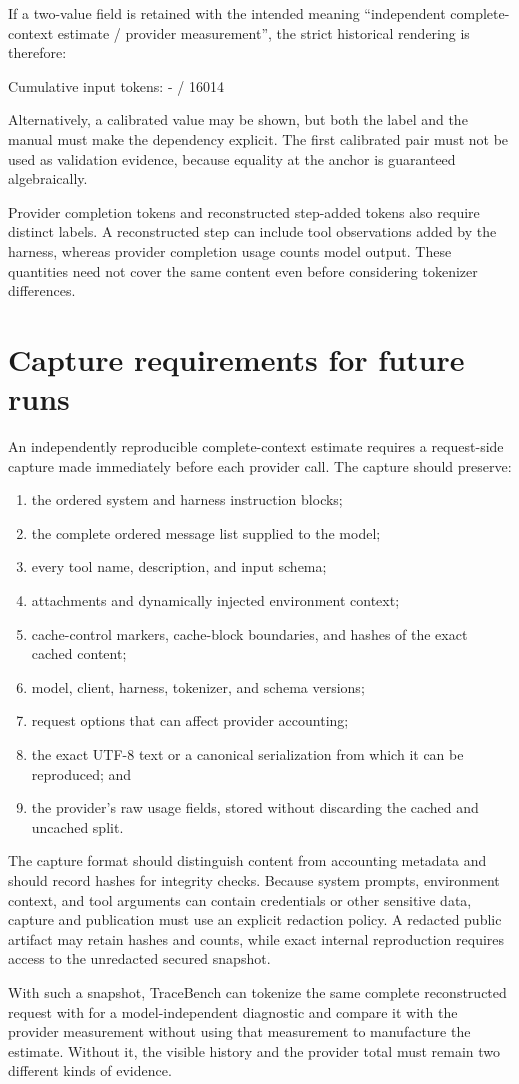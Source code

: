 \documentclass[11pt]{article}
\begin{document}
If a two-value field is retained with the intended meaning
``independent complete-context estimate / provider measurement'', the strict
historical rendering is therefore:
\begin{DocCode}
Cumulative input tokens: - / 16014
\end{DocCode}
Alternatively, a calibrated value may be shown, but both the label and the manual
must make the dependency explicit.  The first calibrated pair must not be used as
validation evidence, because equality at the anchor is guaranteed algebraically.

Provider completion tokens and reconstructed step-added tokens also require
distinct labels.  A reconstructed step can include tool observations added by the
harness, whereas provider completion usage counts model output.  These quantities
need not cover the same content even before considering tokenizer differences.


\section*{Capture requirements for future runs}

An independently reproducible complete-context estimate requires a request-side
capture made immediately before each provider call.  The capture should preserve:
\begin{enumerate}
  \item the ordered system and harness instruction blocks;
  \item the complete ordered message list supplied to the model;
  \item every tool name, description, and input schema;
  \item attachments and dynamically injected environment context;
  \item cache-control markers, cache-block boundaries, and hashes of the exact
  cached content;
  \item model, client, harness, tokenizer, and schema versions;
  \item request options that can affect provider accounting;
  \item the exact UTF-8 text or a canonical serialization from which it can be
  reproduced; and
  \item the provider's raw usage fields, stored without discarding the cached and
  uncached split.
\end{enumerate}

The capture format should distinguish content from accounting metadata and should
record hashes for integrity checks.  Because system prompts, environment context,
and tool arguments can contain credentials or other sensitive data, capture and
publication must use an explicit redaction policy.  A redacted public artifact may
retain hashes and counts, while exact internal reproduction requires access to the
unredacted secured snapshot.

With such a snapshot, TraceBench can tokenize the same complete reconstructed
request with  for a model-independent diagnostic and compare it
with the provider measurement without using that measurement to manufacture the
estimate.  Without it, the visible history and the provider total must remain two
different kinds of evidence.
\end{document}
